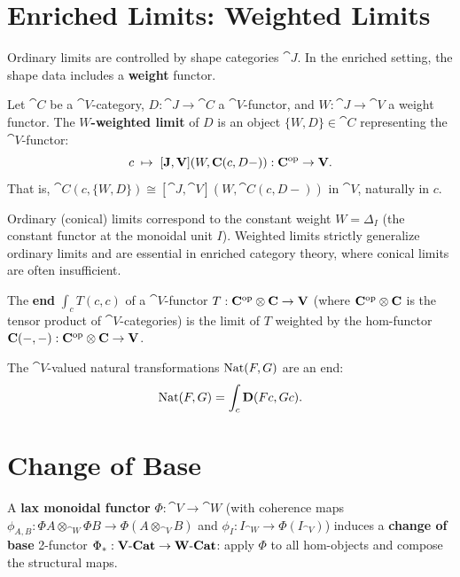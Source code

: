\section{Enriched Limits: Weighted Limits}

Ordinary limits are controlled by shape categories $\cat{J}$. In the enriched setting, the shape data includes a \textbf{weight} functor.

\begin{definition}
Let $\cat{C}$ be a $\cat{V}$-category, $D: \cat{J} \to \cat{C}$ a $\cat{V}$-functor, and $W: \cat{J} \to \cat{V}$ a weight functor. The \textbf{$W$-weighted limit} of $D$ is an object $\{W, D\} \in \cat{C}$ representing the $\cat{V}$-functor:
\[
  c \;\mapsto\; [\mathbf{J}, \mathbf{V}](W, \mathbf{C}(c, D-)): \mathbf{C}^{\mathrm{op}} \to \mathbf{V}.
\]
That is, $\cat{C}(c, \{W,D\}) \cong [\cat{J},\cat{V}](W, \cat{C}(c, D-))$ in $\cat{V}$, naturally in $c$.
\end{definition}

\begin{remark}
Ordinary (conical) limits correspond to the constant weight $W = \Delta_I$ (the constant functor at the monoidal unit $I$). Weighted limits strictly generalize ordinary limits and are essential in enriched category theory, where conical limits are often insufficient.
\end{remark}

\begin{example}
The \textbf{end} $\int_c T(c,c)$ of a $\cat{V}$-functor $T: \mathbf{C}^{\mathrm{op}} \otimes \mathbf{C} \to \mathbf{V}$ (where $\mathbf{C}^{\mathrm{op}} \otimes \mathbf{C}$ is the tensor product of $\cat{V}$-categories) is the limit of $T$ weighted by the hom-functor $\mathbf{C}(-,-): \mathbf{C}^{\mathrm{op}} \otimes \mathbf{C} \to \mathbf{V}$.

The $\cat{V}$-valued natural transformations $\operatorname{Nat}(F,G)$ are an end:
\[
  \operatorname{Nat}(F,G) = \int_c \mathbf{D}(Fc, Gc).
\]
\end{example}

\section{Change of Base}

\begin{definition}
A \textbf{lax monoidal functor} $\Phi: \cat{V} \to \cat{W}$ (with coherence maps $\phi_{A,B}: \Phi A \otimes_{\cat{W}} \Phi B \to \Phi(A \otimes_{\cat{V}} B)$ and $\phi_I: I_{\cat{W}} \to \Phi(I_{\cat{V}})$) induces a \textbf{change of base} 2-functor $\Phi_*: \mathbf{V}\text{-}\mathbf{Cat} \to \mathbf{W}\text{-}\mathbf{Cat}$: apply $\Phi$ to all hom-objects and compose the structural maps.
\end{definition}

